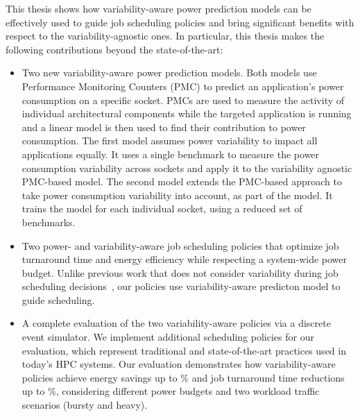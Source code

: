 \par
This thesis shows how variability-aware power prediction models can be effectively used to
guide job scheduling policies and bring significant benefits with respect to the
variability-agnostic ones.
In particular, this thesis makes the following contributions beyond the state-of-the-art:
\begin{itemize} 

	\item Two new variability-aware power prediction models. 
				Both models use Performance Monitoring Counters (PMC) to
				predict an application's 
				power consumption on a specific socket.
				PMCs are used to measure the activity of individual architectural components while 
				the targeted application is running and a linear model is then used to find their 
				contribution to power consumption.
				The first model assumes power variability to impact all applications equally.  
				It uses a single benchmark to measure the power consumption variability across 
				sockets and apply it to the variability agnostic PMC-based model.  
				The second model extends the PMC-based approach to take power consumption 
				variability into account, as part of the model.  It trains the model for each 
				individual socket, using a reduced set of benchmarks.

	\item Two power- and variability-aware job scheduling policies that optimize job 
				turnaround time and energy efficiency while respecting a system-wide power budget.  
				Unlike previous work that does not consider variability during job scheduling 
				decisions~\cite{Inadomi:2015:AMI:2807591.2807638,Teodorescu:2008:VAS:1381306.1382152,Ellsworth:2015:DPS:2807591.2807643,Gholkar:2016:PTH:2967938.2967961}, 
				our policies use variability-aware predicton model to guide scheduling.

	\item A complete evaluation of the two variability-aware policies via a discrete event 
				simulator.  We implement additional scheduling policies for our evaluation, which 
				represent traditional and state-of-the-art  practices used in today's HPC systems.  
				Our evaluation demonstrates how variability-aware policies achieve energy savings 
				up to \MaxEnergy\% and job turnaround time reductions up to \MaxJTT\%, considering 
				different power budgets and two workload traffic scenarios (bursty and heavy).
\end{itemize}    	

